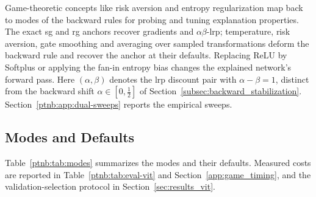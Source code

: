 Game-theoretic concepts like risk aversion and entropy regularization map back to modes of the backward rules for probing and tuning explanation properties. The exact \ac{sg} and \ac{rg} anchors recover gradients and $\alpha\beta$-\ac{lrp}; temperature, risk aversion, gate smoothing and averaging over sampled transformations deform the backward rule and recover the anchor at their defaults. Replacing ReLU by Softplus or applying the fan-in entropy bias changes the explained network's forward pass. Here $(\alpha,\beta)$ denotes the \ac{lrp} discount pair with $\alpha-\beta=1$, distinct from the backward shift $\alpha\in[0,\tfrac12]$ of Section~\ref{subsec:backward_stabilization}. Section~\ref{ptnb:app:dual-sweeps} reports the empirical sweeps.

\subsection{Modes and Defaults}\label{ptnb:app:mode-guide}

Table~\ref{ptnb:tab:modes} summarizes the modes and their defaults. Measured costs are reported in Table~\ref{ptnb:tab:eval-vit} and Section~\ref{app:game_timing}, and the validation-selection protocol in Section~\ref{sec:results_vit}.

\begin{table}[t]
    \centering
    \caption[Game modes: defaults and effects]{Game modes: defaults and effects.
    ``Exact'' stays within a represented rule. $\sigma^2$ is input variance for \ac{ptnbADF}; $N$ counts averaged input transformations.}
    \label{ptnb:tab:modes}
%
\end{table}

